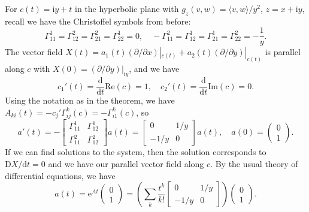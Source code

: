 \documentclass[letter-paper]{tufte-book}
\newenvironment{example}[1][Example]{\begin{trivlist}
\item[\hskip \labelsep {\bfseries #1}]}{\end{trivlist}}
\begin{document}
\begin{example}
  For $c(t) = \mathrm{i}y + t$ in the hyperbolic plane with $g_z(v,w) = \langle v,w\rangle / y^2$, $z=x + \mathrm{i}y$, recall we have the Christoffel symbols from before:
  \begin{equation*}
    \Gamma_{11}^1 = \Gamma_{12}^2 = \Gamma_{21}^2 = \Gamma_{22}^1 = 0, \quad
   -\Gamma_{11}^2 = \Gamma_{12}^1 = \Gamma_{21}^1 = \Gamma_{22}^2 = -\frac{1}{y}. 
  \end{equation*}
  The vector field $X(t) = a_1(t) (\partial/\partial x)|_{c(t)} + a_2(t) (\partial/\partial y)|_{c(t)}$ is parallel along $c$ with $X(0) = (\partial / \partial y)|_{\mathrm{i}y}$, and we have
  \begin{equation*}
    c_1'(t) = \frac{\mathrm{d}}{\mathrm{d}t} \mbox{Re}(c) = 1, \quad
    c_2'(t) = \frac{\mathrm{d}}{\mathrm{d}t} \mbox{Im}(c) = 0.
  \end{equation*}
  Using the notation as in the theorem, we have $A_{ki}(t) = -c_j' \Gamma_{ij}^k(c) = -\Gamma_{i1}^k(c)$, so
  \begin{equation*}
    a'(t) = -\left[\begin{matrix}\Gamma_{11}^1 & \Gamma_{12}^1 \\ \Gamma_{11}^2 & \Gamma_{12}^2\end{matrix}\right] a(t) = \left[\begin{matrix}0 & 1/y \\ -1/y & 0\end{matrix}\right] a(t), \quad a(0) = \begin{pmatrix}0\\ 1\end{pmatrix}.
  \end{equation*}
  If we can find solutions to the system, then the solution corresponds to $\mathrm{D}X / \mathrm{d}t = 0$ and we have our parallel vector field along $c$. By the usual theory of differential equations, we have
  \begin{equation*}
    a(t) = \mathrm{e}^{At}\begin{pmatrix}0\\ 1\end{pmatrix} = \left(\sum_k \frac{t^k}{k!}\left[\begin{matrix}0 & 1/y \\ -1/y & 0\end{matrix}\right] \right)\begin{pmatrix}0\\ 1\end{pmatrix}.
  \end{equation*}

\end{example}
\end{document}
